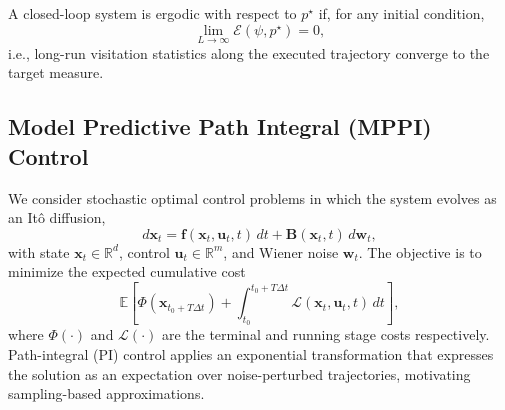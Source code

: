 \documentclass[conference]{IEEEtran}
\begin{document}
A closed-loop system is ergodic with respect to $p^\star$ if, for any initial condition,
\begin{equation}
    \lim_{L\to\infty}\mathcal{E}(\psi, p^\star)=0,
\end{equation}
i.e., long-run visitation statistics along the executed trajectory converge to the target measure.

\subsection{Model Predictive Path Integral (MPPI) Control}\label{sec:mppi}
We consider stochastic optimal control problems in which the system evolves as an It\^o diffusion,
\begin{equation}\label{eq:sde}
    d\mathbf{x}_t = \mathbf{f}(\mathbf{x}_t,\mathbf{u}_t,t)\,dt + \mathbf{B}(\mathbf{x}_t,t)\,d\mathbf{w}_t,
\end{equation}
with state $\mathbf{x}_t\in\mathbb{R}^d$, control $\mathbf{u}_t\in\mathbb{R}^m$, and Wiener noise $\mathbf{w}_t$. The objective is to minimize the expected cumulative cost
\begin{equation}\label{eq:optimal_input}
    \mathbb{E}\left[\Phi(\mathbf{x}_{t_0+T\Delta t}) + \int_{t_0}^{t_0+T\Delta t} \mathcal{L}(\mathbf{x}_t,\mathbf{u}_t,t)\,dt\right],
\end{equation}
where \(\Phi(\cdot)\) and \(\mathcal L(\cdot)\) are the terminal and running stage costs respectively.
Path-integral (PI) control applies an exponential transformation that expresses the solution as an expectation over noise-perturbed trajectories, motivating sampling-based approximations.
\end{document}
